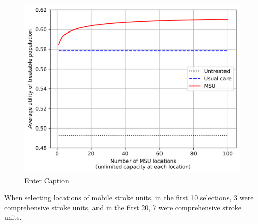 \begin{figure}
    \centering
    \includegraphics[width=0.5\linewidth]{images/greedy.png}
    \caption{Enter Caption}
    \label{fig:enter-label}
\end{figure}

When selecting locations of mobile stroke units, in the first 10 selections, 3 were comprehensive stroke units, and in the first 20, 7 were comprehensive stroke units.
